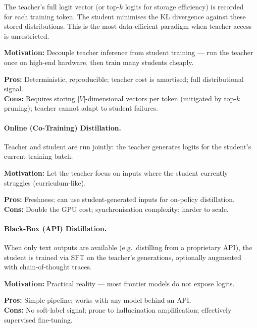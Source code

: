 The teacher’s full logit vector (or top-$k$ logits for storage efficiency) is recorded for each training token. The student minimises the KL divergence against these stored distributions. This is the most data-efficient paradigm when teacher access is unrestricted.

\textbf{Motivation:} Decouple teacher inference from student training --- run the teacher once on high-end hardware, then train many students cheaply.

\textbf{Pros:} Deterministic, reproducible; teacher cost is amortised; full distributional signal.\\

\textbf{Cons:} Requires storing $|V|$-dimensional vectors per token (mitigated by top-$k$ pruning); teacher cannot adapt to student failures.

\paragraph{Online (Co-Training) Distillation.}
\label{online-co-training-distillation.}

Teacher and student are run jointly: the teacher generates logits for the student’s current training batch.

\textbf{Motivation:} Let the teacher focus on inputs where the student currently struggles (curriculum-like).

\textbf{Pros:} Freshness; can use student-generated inputs for on-policy distillation.\\

\textbf{Cons:} Double the GPU cost; synchronisation complexity; harder to scale.

\paragraph{Black-Box (API) Distillation.}
\label{black-box-api-distillation.}

When only text outputs are available (e.g.~distilling from a proprietary API), the student is trained via SFT on the teacher’s generations, optionally augmented with chain-of-thought traces.

\textbf{Motivation:} Practical reality --- most frontier models do not expose logits.

\textbf{Pros:} Simple pipeline; works with any model behind an API.\\

\textbf{Cons:} No soft-label signal; prone to hallucination amplification; effectively supervised fine-tuning.

